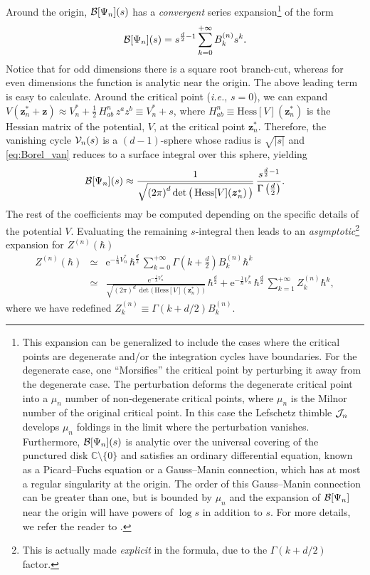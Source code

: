 \documentclass[11pt,a4paper]{article}
\newcommand{\CB}{{\cal B}}
\newcommand{\CJ}{{\cal J}}
\newcommand{\CV}{{\cal V}}
\def\BC{{\mathbb C}}
\newcommand{\be}{\begin{equation}}
\newcommand{\ee}{\end{equation}}
\newcommand{\bea}{\begin{eqnarray}}
\newcommand{\eea}{\end{eqnarray}}
\newcommand{\rme}{{\mathrm{e}}}
\begin{document}
Around the origin, $\CB[\Psi_n](s)$ has a \textit{convergent} series expansion\footnote{This expansion can be generalized to include the cases where the critical points are degenerate and/or the integration cycles have boundaries. For the degenerate case, one ``Morsifies'' the critical point by perturbing it away from the degenerate case. The perturbation deforms the degenerate critical point into a $\mu_n$ number of non-degenerate critical points, where $\mu_n$ is the Milnor number of the original critical point. In this case the Lefschetz thimble $\CJ_n$ develops $\mu_n$ foldings in the limit where the perturbation vanishes. Furthermore, $\CB[\Psi_n](s)$ is analytic over the universal covering of the punctured disk $\BC \setminus \{0\}$ and satisfies an ordinary differential equation, known as a Picard--Fuchs equation or a Gauss--Manin connection, which has at most a regular singularity at the origin. The order of this Gauss--Manin connection can be greater than one, but is bounded by $\mu_n$ and the expansion of $\CB[\Psi_n]$ near the origin will have powers of $\log s$ in addition to $s$. For more details, we refer the reader to \cite{m74, p83, p85, dh02}.} of the form
%
\be
\CB[\Psi_n](s) = s^{\frac{d}{2}-1} \sum_{k=0}^{+\infty} B^{(n)}_k s^k.
\ee
%
\noindent
Notice that for odd dimensions there is a square root branch-cut, whereas for even dimensions the function is analytic near the origin. The above leading term is easy to calculate. Around the critical point (\textit{i.e.}, $s=0$), we can expand $V (\boldsymbol{z}^*_n + \boldsymbol{z}) \approx V^*_n + \frac{1}{2}\, H_{ab}^{n}\, z^a z^b \equiv V^*_n + s$, where $H_{ab}^{n} \equiv \text{Hess} [V] (\boldsymbol{z}^*_n)$ is the Hessian matrix of the potential, $V$, at the critical point $\boldsymbol{z}^*_n$. Therefore, the vanishing cycle $\CV_n (s)$ is a $(d-1)$-sphere whose radius is $\sqrt{|s|}$ and \eqref{eq:Borel_van} reduces to a surface integral over this sphere, yielding
%
\be
\CB[\Psi_n](s) \approx \frac{1}{\sqrt{\left( 2\pi \right)^d \det \big(\, \text{Hess} [V] (\boldsymbol{z}^*_n)\, \big)}}\, \frac{s^{\frac{d}{2}-1}}{\Gamma \left( \frac{d}{2} \right)}.
\ee
%
\noindent
The rest of the coefficients may be computed depending on the specific details of the potential $V$. Evaluating the remaining $s$-integral then leads to an \textit{asymptotic}\footnote{This is actually made \textit{explicit} in the formula, due to the $\Gamma \left(k+d/2\right)$ factor.} expansion for $Z^{(n)} (\hbar)$
%
\bea
Z^{(n)} (\hbar) &\simeq& \rme^{- \frac{1}{\hbar} V^*_n}\, \hbar^{\frac{d}{2}}\, \sum_{k=0}^{+\infty} \Gamma \left( k + \frac{d}{2} \right) B^{(n)}_k \hbar^{k} \\
&\simeq& \frac{\rme^{- \frac{1}{\hbar} V^*_n}}{\sqrt{(2 \pi)^{d}\, \det \big(\, \text{Hess} [V] (\boldsymbol{z}^*_n)\, \big)}}\, \hbar^{\frac{d}{2}} + \rme^{- \frac{1}{\hbar} V^*_n}\, \hbar^{\frac{d}{2}}\, \sum_{k=1}^{+\infty} Z^{(n)}_k \hbar^{k},
\eea
%
\noindent
where we have redefined $Z^{(n)}_k \equiv \Gamma \left(k+d/2 \right) B^{(n)}_k$. 
\end{document}
